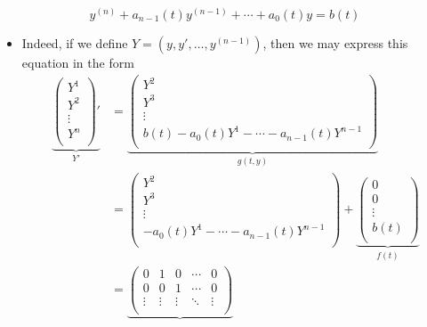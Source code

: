 \documentclass[../notes.tex]{subfiles}
\begin{document}
\begin{itemize}
\begin{equation*}
        y^{(n)}+a_{n-1}(t)y^{(n-1)}+\cdots+a_0(t)y = b(t)
    \end{equation*}
    \begin{itemize}
        \item Indeed, if we define $Y=(y,y',\dots,y^{(n-1)})$, then we may express this equation in the form
        \begin{align*}
            \underbrace{
                \begin{pmatrix}
                    Y^1\\
                    Y^2\\
                    \vdots\\
                    Y^n\\
                \end{pmatrix}'
            }_{Y'}
            &= \underbrace{
                \begin{pmatrix}
                    Y^2\\
                    Y^3\\
                    \vdots\\
                    b(t)-a_0(t)Y^1-\cdots-a_{n-1}(t)Y^{n-1}\\
                \end{pmatrix}
            }_{g(t,y)}\\
            &=
            \begin{pmatrix}
                Y^2\\
                Y^3\\
                \vdots\\
                -a_0(t)Y^1-\cdots-a_{n-1}(t)Y^{n-1}\\
            \end{pmatrix}
            +\underbrace{
                \begin{pmatrix}
                    0\\
                    0\\
                    \vdots\\
                    b(t)\\
                \end{pmatrix}
            }_{f(t)}\\
            &= \underbrace{
                \begin{pmatrix}
                    0 & 1 & 0 & \cdots & 0\\
                    0 & 0 & 1 & \cdots & 0\\
                    \vdots & \vdots & \vdots & \ddots & \vdots\\

\end{pmatrix}}
\end{align*}
\end{itemize}
\end{itemize}
\end{document}

